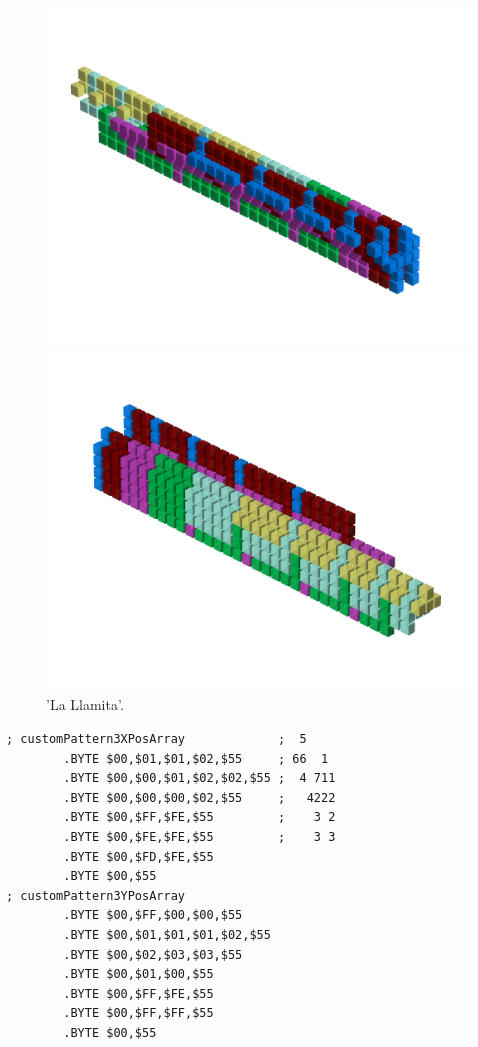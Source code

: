 \begin{figure}[H]
    \centering
    \begin{adjustbox}{width=12cm,center}
      \includegraphics[width=12cm]{src/patterns/pattern11-45.png}%
    \end{adjustbox}
    \begin{adjustbox}{width=12cm,margin=0cm -4cm}
      \includegraphics[width=12cm]{src/patterns/pattern11-225.png}%
    \end{adjustbox}
\caption{'La Llamita'.}
\end{figure}
\clearpage

\begin{lstlisting}
; customPattern3XPosArray             ;  5    
        .BYTE $00,$01,$01,$02,$55     ; 66  1 
        .BYTE $00,$00,$01,$02,$02,$55 ;  4 711
        .BYTE $00,$00,$00,$02,$55     ;   4222
        .BYTE $00,$FF,$FE,$55         ;    3 2
        .BYTE $00,$FE,$FE,$55         ;    3 3
        .BYTE $00,$FD,$FE,$55
        .BYTE $00,$55
; customPattern3YPosArray
        .BYTE $00,$FF,$00,$00,$55
        .BYTE $00,$01,$01,$01,$02,$55
        .BYTE $00,$02,$03,$03,$55
        .BYTE $00,$01,$00,$55
        .BYTE $00,$FF,$FE,$55
        .BYTE $00,$FF,$FF,$55
        .BYTE $00,$55
\end{lstlisting}


